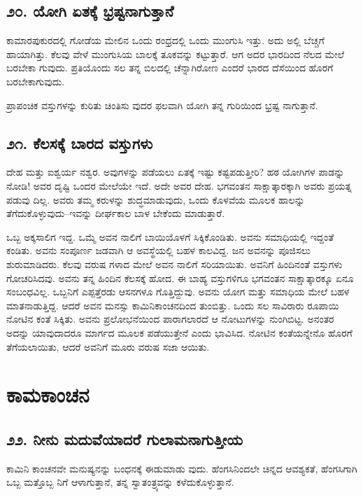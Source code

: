 \section{\num{೨೦.} ಯೋಗಿ ಏತಕ್ಕೆ ಭ್ರಷ್ಟನಾಗುತ್ತಾನೆ}

ಕಾಮಾರಪುಕುರದಲ್ಲಿ ಗೋಡೆಯ ಮೇಲಿನ ಒಂದು ರಂಧ್ರದಲ್ಲಿ ಒಂದು ಮುಂಗುಸಿ ಇತ್ತು. ಅದು ಅಲ್ಲಿ ಬೆಚ್ಚಗೆ ಹಾಯಾಗಿತ್ತು. ಕೆಲವು ವೇಳೆ ಮುಂಗುಸಿಯ ಬಾಲಕ್ಕೆ ತೂಕವನ್ನು ಕಟ್ಟುತ್ತಾರೆ. ಆಗ ಅದರ ಭಾರದಿಂದ ನೆಲದ ಮೇಲೆ ಬರಬೇಕಾ ಗುವುದು. ಪ್ರತಿಯೊಂದು ಸಲ ತನ್ನ ಬಿಲದಲ್ಲಿ ಚೆನ್ನಾಗಿರೋಣ ಎಂದರೆ ಭಾರದ ದೆಸೆಯಿಂದ ಹೊರಗೆ ಬರಬೇಕಾಗುವುದು.

ಪ್ರಾಪಂಚಿಕ ವಸ್ತುಗಳನ್ನು ಕುರಿತು ಚಿಂತಿಸು ವುದರ ಫಲವಾಗಿ ಯೋಗಿ ತನ್ನ ಗುರಿಯಿಂದ ಭ್ರಷ್ಟ ನಾಗುತ್ತಾನೆ.


\section{\num{೨೧.} ಕೆಲಸಕ್ಕೆ ಬಾರದ ವಸ್ತುಗಳು}

ದೇಹ ಮತ್ತು ಐಶ್ವರ್ಯ ನಶ್ವರ. ಅವುಗಳನ್ನು ಪಡೆಯಲು ಏತಕ್ಕೆ ಇಷ್ಟು ಕಷ್ಟಪಡುತ್ತೀರಿ? ಹಠ ಯೋಗಿಗಳ ಪಾಡನ್ನು ನೋಡಿ! ಅವರ ದೃಷ್ಟಿ ಒಂದರ ಮೇಲೆಯೇ ಇದೆ. ಅದೇ ಅವರ ದೇಹ. ಭಗವಂತನ ಸಾಕ್ಷಾತ್ಕಾರಕ್ಕಾಗಿ ಅವರು ಪ್ರಯತ್ನ ಪಡುವು ದಿಲ್ಲ. ಅವರು ತಮ್ಮ ಕರುಳನ್ನು ಶುದ್ಧಮಾಡುವುದು, ಒಂದು ಕೊಳವೆಯ ಮೂಲಕ ಹಾಲನ್ನು ತೆಗೆದುಕೊಳ್ಳುವುದು–ಇವನ್ನು ದೀರ್ಘಕಾಲ ಬಾಳ ಬೇಕೆಂದು ಮಾಡುತ್ತಾರೆ.

ಒಬ್ಬ ಅಕ್ಕಸಾಲಿಗ ಇದ್ದ. ಒಮ್ಮೆ ಅವನ ನಾಲಿಗೆ ಬಾಯಿಯೊಳಗೆ ಸಿಕ್ಕಿಕೊಂಡಿತು. ಅವನು ಸಮಾಧಿಯಲ್ಲಿ ಇದ್ದಂತೆ ಕಂಡಿತು. ಅವನು ಸಂಪೂರ್ಣ ಜಡವಾಗಿ ಆ ಅವಸ್ಥೆಯಲ್ಲಿ ಬಹಳ ಕಾಲವಿದ್ದ. ಜನ ಅವನನ್ನು ಪೂಜಿಸಲು ಶುರುಮಾಡಿದರು. ಕೆಲವು ವರುಷ ಗಳಾದ ಮೇಲೆ ಅವನ ನಾಲಿಗೆ ಸರಿಯಾಯಿತು. ಅವನಿಗೆ ಹಿಂದಿನಂತೆ ವಸ್ತುಗಳು ಗೋಚರಿಸಿದವು. ಅವನು ತನ್ನ ಹಿಂದಿನ ಕೆಲಸಕ್ಕೆ ಹೋದ. ಈ ಬಾಹ್ಯ ವಸ್ತುಗಳಿಗೂ ಭಗವಂತನ ಸಾಕ್ಷಾತ್ಕಾರಕ್ಕೂ ಏನೂ ಸಂಬಂಧವಿಲ್ಲ. ಒಬ್ಬನಿಗೆ ಎಪ್ಪತ್ತೆರಡು ಆಸನಗಳೂ ಗೊತ್ತಿದ್ದುವು. ಅವನು ಯೋಗ ಮತ್ತು ಸಮಾಧಿಯ ಮೇಲೆ ಬಹಳ ಮಾತನಾಡುತ್ತಿದ್ದ. ಆದರೆ ಅವನ ಮನಸ್ಸು ಕಾಮಿನಿಕಾಂಚನದಿಂದ ತುಂಬಿತ್ತು. ಒಂದು ಸಲ ಸಾವಿರಾರು ರೂಪಾಯಿ ನೋಟಿನ ಕಂತೆ ಸಿಕ್ಕಿತು. ಅವನು ಪ್ರಲೋಭನೆಯಿಂದ ಪಾರಾಗಲಾರದೆ ಆ ನೋಟುಗಳನ್ನು ನುಂಗಿಬಿಟ್ಟ. ಅನಂತರ ಅದನ್ನು ಯಾವುದಾದರೂ ಮಾರ್ಗದ ಮೂಲಕ ಪಡೆಯುತ್ತೇನೆ ಎಂದು ಭಾವಿಸಿದ. ನೋಟಿನ ಕಂತೆಯನ್ನೇನೊ ಹೊರಗೆ ತೆಗೆಯಲಾಯಿತು, ಆದರೆ ಅವನಿಗೆ ಮೂರು ವರುಷ ಸಜಾ ಆಯಿತು.

\chapter{ಕಾಮಕಾಂಚನ}

\section{\num{೨೨. } ನೀನು ಮದುವೆಯಾದರೆ ಗುಲಾಮನಾಗುತ್ತೀಯ}

ಕಾಮಿನಿ ಕಾಂಚನವೇ ಮನುಷ್ಯನನ್ನು ಬಂಧನಕ್ಕೆ ಈಡುಮಾಡು ವುದು. ಹೆಂಗಸಿನಿಂದಲೇ ಚಿನ್ನದ ಆವಶ್ಯಕತೆ, ಹೆಂಗಸಿಗಾಗಿ ಒಬ್ಬ ಮತ್ತೊಬ್ಬ ನಿಗೆ ಆಳಾಗುತ್ತಾನೆ, ತನ್ನ ಸ್ವಾತಂತ್ರ್ಯವನ್ನು ಕಳೆದುಕೊಳ್ಳುತ್ತಾನೆ.

